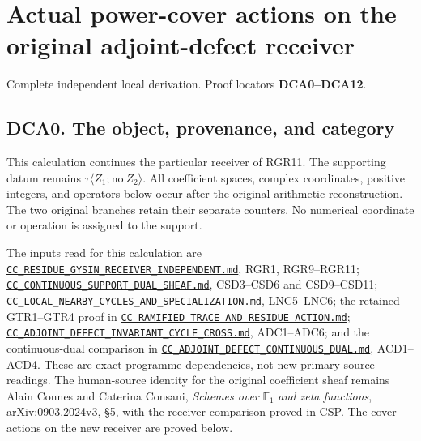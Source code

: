 \section{Actual power-cover actions on the original adjoint-defect
receiver}\label{actual-power-cover-actions-on-the-original-adjoint-defect-receiver}

Complete independent local derivation. Proof locators
\textbf{DCA0--DCA12}.

\subsection{DCA0. The object, provenance, and
category}\label{dca0.-the-object-provenance-and-category}

This calculation continues the particular receiver of RGR11. The
supporting datum remains \(\tau\langle Z_1;\mathrm{no}\ Z_2\rangle\).
All coefficient spaces, complex coordinates, positive integers, and
operators below occur after the original arithmetic reconstruction. The
two original branches retain their separate counters. No numerical
coordinate or operation is assigned to the support.

The inputs read for this calculation are
\href{https://github.com/KokunoYumeto/zeta-function-research-reader/blob/main/workbenches/splitzero-tandem/continuations/20260924-cohomology-weight-and-character-lifts/gct-weight-control/proofs/CC_RESIDUE_GYSIN_RECEIVER_INDEPENDENT.md}{\nolinkurl{CC_RESIDUE_GYSIN_RECEIVER_INDEPENDENT.md}},
RGR1, RGR9--RGR11;
\href{https://github.com/KokunoYumeto/zeta-function-research-reader/blob/main/workbenches/splitzero-tandem/continuations/20260924-cohomology-weight-and-character-lifts/gct-weight-control/proofs/CC_CONTINUOUS_SUPPORT_DUAL_SHEAF.md}{\nolinkurl{CC_CONTINUOUS_SUPPORT_DUAL_SHEAF.md}},
CSD3--CSD6 and CSD9--CSD11;
\href{https://github.com/KokunoYumeto/zeta-function-research-reader/blob/main/workbenches/splitzero-tandem/continuations/20260924-cohomology-weight-and-character-lifts/gct-weight-control/proofs/CC_LOCAL_NEARBY_CYCLES_AND_SPECIALIZATION.md}{\nolinkurl{CC_LOCAL_NEARBY_CYCLES_AND_SPECIALIZATION.md}},
LNC5--LNC6; the retained GTR1--GTR4 proof in
\href{CC_RAMIFIED_TRACE_AND_RESIDUE_ACTION.md}{\nolinkurl{CC_RAMIFIED_TRACE_AND_RESIDUE_ACTION.md}};
\href{CC_ADJOINT_DEFECT_INVARIANT_CYCLE_CROSS.md}{\nolinkurl{CC_ADJOINT_DEFECT_INVARIANT_CYCLE_CROSS.md}},
ADC1--ADC6; and the continuous-dual comparison in
\href{CC_ADJOINT_DEFECT_CONTINUOUS_DUAL.md}{\nolinkurl{CC_ADJOINT_DEFECT_CONTINUOUS_DUAL.md}},
ACD1--ACD4. These are exact programme dependencies, not new
primary-source readings. The human-source identity for the original
coefficient sheaf remains Alain Connes and Caterina Consani,
\emph{Schemes over} \(\mathbb F_1\) \emph{and zeta functions},
\href{https://arxiv.org/abs/0903.2024v3}{arXiv:0903.2024v3, §5}, with
the receiver comparison proved in CSP. The cover actions on the new
receiver are proved below.

